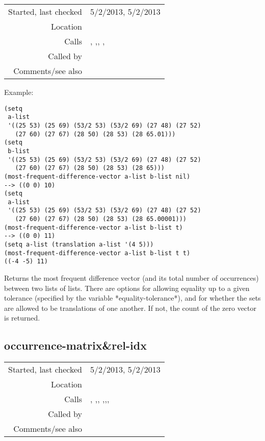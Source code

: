 \vspace{0.3cm}
\begin{tabular}{r|p{8cm}}
Started, last checked & 5/2/2013, 5/2/2013 \\
Location & \nameref{sec:robust-metrics} \\
Calls & \nameref{fun:constant-vector}, \nameref{fun:difference-lists},\newline \nameref{fun:frequency-count}, \nameref{fun:nth-list-of-lists},\newline \nameref{fun:sort-dataset-asc} \\
Called by & \nameref{fun:cardinality-score} \\
Comments/see also &
\end{tabular}

\vspace{0.5cm}
\noindent Example:
\begin{verbatim}
(setq
 a-list
 '((25 53) (25 69) (53/2 53) (53/2 69) (27 48) (27 52)
   (27 60) (27 67) (28 50) (28 53) (28 65.01)))
(setq
 b-list
 '((25 53) (25 69) (53/2 53) (53/2 69) (27 48) (27 52)
   (27 60) (27 67) (28 50) (28 53) (28 65)))
(most-frequent-difference-vector a-list b-list nil)
--> ((0 0) 10)
(setq
 a-list
 '((25 53) (25 69) (53/2 53) (53/2 69) (27 48) (27 52)
   (27 60) (27 67) (28 50) (28 53) (28 65.00001)))
(most-frequent-difference-vector a-list b-list t)
--> ((0 0) 11)
(setq a-list (translation a-list '(4 5)))
(most-frequent-difference-vector a-list b-list t t)
((-4 -5) 11)
\end{verbatim}

\noindent Returns the most frequent difference vector
(and its total number of occurrences) between two
lists of lists. There are options for allowing
equality up to a given tolerance (specified by the
variable *equality-tolerance*), and for whether the
sets are allowed to be translations of one another.
If not, the count of the zero vector is returned.


\subsection*{occurrence-matrix\&rel-idx}\label{fun:occurrence-matrixnrel-idx}

\vspace{0.3cm}
\begin{tabular}{r|p{8cm}}
Started, last checked & 5/2/2013, 5/2/2013 \\
Location & \nameref{sec:robust-metrics} \\
Calls & \nameref{fun:add-to-list}, \nameref{fun:cardinality-score},\newline \nameref{fun:establishment-matrix}, \nameref{fun:first-n-naturals},\newline \nameref{fun:indices-of-matrix-passing-tests},\newline \nameref{fun:precision-matrix}, \nameref{fun:score-matrix} \\
Called by & \nameref{fun:occurrence-metric} \\
Comments/see also &
\end{tabular}

